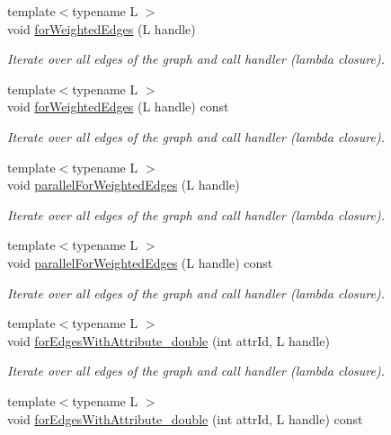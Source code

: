 \begin{DoxyCompactItemize}
{\footnotesize template$<$typename L $>$ }\\void \hyperlink{class_networ_kit_1_1_graph_a5cfc35c769c1edc8805aa9b93ac096cf}{for\-Weighted\-Edges} (L handle)
\begin{DoxyCompactList}\small\item\em Iterate over all edges of the graph and call handler (lambda closure). \end{DoxyCompactList}\item 
{\footnotesize template$<$typename L $>$ }\\void \hyperlink{class_networ_kit_1_1_graph_a561e122e5eec4a7a5fb6867fc01b6dec}{for\-Weighted\-Edges} (L handle) const 
\begin{DoxyCompactList}\small\item\em Iterate over all edges of the graph and call handler (lambda closure). \end{DoxyCompactList}\item 
{\footnotesize template$<$typename L $>$ }\\void \hyperlink{class_networ_kit_1_1_graph_ab015dda7fdcfe35c2b61473c47f76348}{parallel\-For\-Weighted\-Edges} (L handle)
\begin{DoxyCompactList}\small\item\em Iterate over all edges of the graph and call handler (lambda closure). \end{DoxyCompactList}\item 
{\footnotesize template$<$typename L $>$ }\\void \hyperlink{class_networ_kit_1_1_graph_a517abe475e68e421037a99fe2945f96a}{parallel\-For\-Weighted\-Edges} (L handle) const 
\begin{DoxyCompactList}\small\item\em Iterate over all edges of the graph and call handler (lambda closure). \end{DoxyCompactList}\item 
{\footnotesize template$<$typename L $>$ }\\void \hyperlink{class_networ_kit_1_1_graph_aaa1d8ce38bb9d2603ea2426f920699d6}{for\-Edges\-With\-Attribute\-\_\-double} (int attr\-Id, L handle)
\begin{DoxyCompactList}\small\item\em Iterate over all edges of the graph and call handler (lambda closure). \end{DoxyCompactList}\item 
{\footnotesize template$<$typename L $>$ }\\void \hyperlink{class_networ_kit_1_1_graph_af6125dbd6c44078f3664e7fdbfb8b818}{for\-Edges\-With\-Attribute\-\_\-double} (int attr\-Id, L handle) const 

\end{DoxyCompactItemize}

